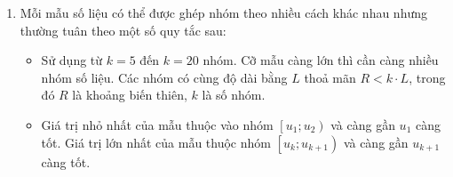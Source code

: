\begin{enumerate}[\iconMT]
\begin{tcolorbox}[colframe=cyan,colback=red!3!white,boxrule=0.5mm]
\begin{itemize}
		\end{itemize}
	\end{tcolorbox}
\item{} Mỗi mẫu số liệu có thể được ghép nhóm theo nhiều cách khác nhau nhưng thường tuân theo một số quy tắc sau:
\begin{itemize}
	\item Sử dụng từ $k=5$ đến $k=20$ nhóm. Cỡ mẫu càng lớn thì cần càng nhiều nhóm số liệu. Các nhóm có cùng độ dài bằng $L$ thoả mãn $R<k\cdot L$, trong đó $R$ là khoảng biến thiên, $k$ là số nhóm.
	\item Giá trị nhỏ nhất của mẫu thuộc vào nhóm $\left[u_1; u_2\right)$ và càng gần $u_1$ càng tốt. Giá trị lớn nhất của mẫu thuộc nhóm $\left[u_k; u_{k+1}\right)$ và càng gần $u_{k+1}$ càng tốt.
\end{itemize}
\end{enumerate}

